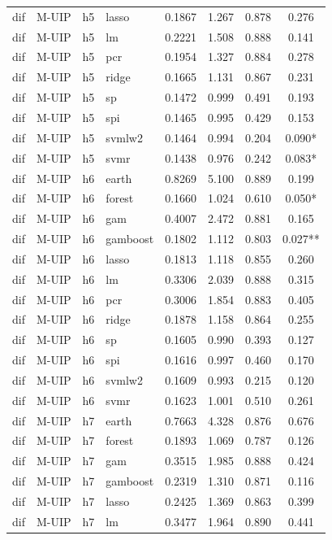 \begin{ThreePartTable}
\begin{longtable}[t]{llclcccc}
dif & M-UIP & h5 & lasso & 0.1867 & 1.267 & 0.878 & 0.276\\
dif & M-UIP & h5 & lm & 0.2221 & 1.508 & 0.888 & 0.141\\
dif & M-UIP & h5 & pcr & 0.1954 & 1.327 & 0.884 & 0.278\\
dif & M-UIP & h5 & ridge & 0.1665 & 1.131 & 0.867 & 0.231\\
dif & M-UIP & h5 & sp & 0.1472 & 0.999 & 0.491 & 0.193\\
dif & M-UIP & h5 & spi & 0.1465 & 0.995 & 0.429 & 0.153\\
dif & M-UIP & h5 & svmlw2 & 0.1464 & 0.994 & 0.204 & 0.090*\\
dif & M-UIP & h5 & svmr & 0.1438 & 0.976 & 0.242 & 0.083*\\
\addlinespace
dif & M-UIP & h6 & earth & 0.8269 & 5.100 & 0.889 & 0.199\\
dif & M-UIP & h6 & forest & 0.1660 & 1.024 & 0.610 & 0.050*\\
dif & M-UIP & h6 & gam & 0.4007 & 2.472 & 0.881 & 0.165\\
dif & M-UIP & h6 & gamboost & 0.1802 & 1.112 & 0.803 & 0.027**\\
dif & M-UIP & h6 & lasso & 0.1813 & 1.118 & 0.855 & 0.260\\
dif & M-UIP & h6 & lm & 0.3306 & 2.039 & 0.888 & 0.315\\
dif & M-UIP & h6 & pcr & 0.3006 & 1.854 & 0.883 & 0.405\\
dif & M-UIP & h6 & ridge & 0.1878 & 1.158 & 0.864 & 0.255\\
dif & M-UIP & h6 & sp & 0.1605 & 0.990 & 0.393 & 0.127\\
dif & M-UIP & h6 & spi & 0.1616 & 0.997 & 0.460 & 0.170\\
dif & M-UIP & h6 & svmlw2 & 0.1609 & 0.993 & 0.215 & 0.120\\
dif & M-UIP & h6 & svmr & 0.1623 & 1.001 & 0.510 & 0.261\\
\addlinespace
dif & M-UIP & h7 & earth & 0.7663 & 4.328 & 0.876 & 0.676\\
dif & M-UIP & h7 & forest & 0.1893 & 1.069 & 0.787 & 0.126\\
dif & M-UIP & h7 & gam & 0.3515 & 1.985 & 0.888 & 0.424\\
dif & M-UIP & h7 & gamboost & 0.2319 & 1.310 & 0.871 & 0.116\\
dif & M-UIP & h7 & lasso & 0.2425 & 1.369 & 0.863 & 0.399\\
dif & M-UIP & h7 & lm & 0.3477 & 1.964 & 0.890 & 0.441\\

\end{longtable}
\end{ThreePartTable}
